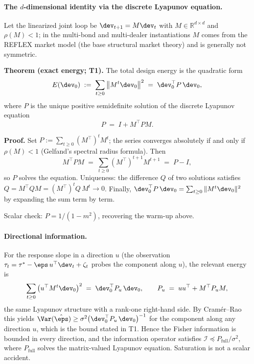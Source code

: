 \paragraph{The $d$-dimensional identity via the discrete Lyapunov equation.}
Let the linearized joint loop be $\dev_{t+1} = M \dev_t$ with
$M \in \mathbb{R}^{d \times d}$ and $\rho(M) < 1$; in the multi-bond and
multi-dealer instantiations $M$ comes from the REFLEX market model \citep{reflex2026} (the base
structural market theory) and is generally not symmetric.

\textbf{Theorem (exact energy; T1).} The total design energy is the
quadratic form
\begin{equation*}
E(\dev_0) \;:=\; \sum_{t \ge 0} \big\| M^t \dev_0 \big\|^2
\;=\; \dev_0^\top P\,\dev_0,
\end{equation*}
where $P$ is the unique positive semidefinite solution of the discrete
Lyapunov equation
\begin{equation*}
P \;=\; I + M^\top P M.
\end{equation*}

\textbf{Proof.} Set $P := \sum_{t \ge 0} (M^\top)^t M^t$; the series
converges absolutely if and only if $\rho(M) < 1$ (Gelfand's spectral
radius formula). Then
\begin{equation*}
M^\top P M \;=\; \sum_{t \ge 0} (M^\top)^{t+1} M^{t+1} \;=\; P - I,
\end{equation*}
so $P$ solves the equation. Uniqueness: the difference $Q$ of two solutions
satisfies $Q = M^\top Q M = (M^\top)^t Q\, M^t \to 0$. Finally,
$\dev_0^\top P\,\dev_0 = \sum_{t \ge 0} \|M^t \dev_0\|^2$ by expanding the
sum term by term. \qedsymbol

Scalar check: $P = 1/(1 - m^2)$, recovering the warm-up above.

\paragraph{Directional information.}
For the response slope in a direction $u$ (the observation
$\tau_t = \tau^{*} - \eps\, u^\top \dev_t + \zeta_t$ probes the component
along $u$), the relevant energy is
\begin{equation*}
\sum_{t \ge 0} \big( u^\top M^t \dev_0 \big)^2
\;=\; \dev_0^\top P_u\,\dev_0,
\qquad
P_u \;=\; u u^\top + M^\top P_u M,
\end{equation*}
the same Lyapunov structure with a rank-one right-hand side. By
Cram\'er--Rao this yields
$\Var(\hat\eps) \ge \sigma^2 \big( \dev_0^\top P_u\,\dev_0 \big)^{-1}$ for
the component along any direction $u$, which is the bound stated in T1.
Hence the Fisher information is bounded in every direction, and the
information operator satisfies
$\mathcal{I} \preceq P_{\mathrm{full}} / \sigma^2$, where
$P_{\mathrm{full}}$ solves the matrix-valued Lyapunov equation. Saturation
is not a scalar accident.

